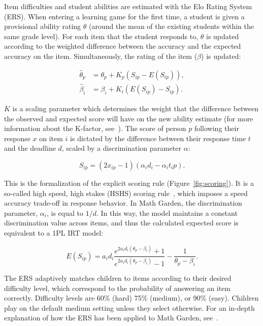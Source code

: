 \documentclass{edm_article}
\begin{document}
Item difficulties and student abilities are estimated with the Elo Rating System (ERS). %
When entering a learning game for the first time, a student is given a provisional ability rating $\theta$ (around the mean of the existing students within the same grade level). For each item that the student responds to, $\theta$ is updated according to the weighted difference between the accuracy and the expected accuracy on the item. Simultaneously, the rating of the item ($\beta$) is updated: 

\begin{align}
    \hat{\theta}_p &= \theta_p + K_p(S_{ip} - E(S_{ip})), \\
    \hat{\beta}_i &= \beta_i + K_i(E(S_{ip}) - S_{ip}).
\end{align}

\noindent $K$ is a scaling parameter which determines the weight that the difference between the observed and expected score will have on the new ability estimate (for more information about the K-factor, see~\cite{vermeiren2024balancing}). The score of person $p$ following their response $x$ on item $i$ is dictated by the difference between their response time $t$ and the deadline $d$, scaled by a discrimination parameter $\alpha$:

\begin{equation}
    S_{ip} = (2x_{ip} - 1)(\alpha_id_i - \alpha_it_ip).
    \label{eq:scoring}
\end{equation}

\noindent This is the formalization of the explicit scoring rule (Figure~\ref{fig:scoring}). It is a so-called high speed, high stakes (HSHS) scoring rule~\cite{maris2012speed}, which imposes a speed accuracy trade-off in response behavior. In Math Garden, the discrimination parameter, $\alpha_i$, is equal to $1/d$. In this way, the model maintains a constant discrimination value across items, and thus the calculated expected score is equivalent to a 1PL IRT model: 

\begin{equation}
    E(S_{ip}) = a_i d_i \frac{e^{2 a_i d_i (\theta_p - \beta_i)} + 1}{e^{2 a_i d_i (\theta_p - \beta_i)} - 1} - \frac{1}{\theta_p - \beta_i}.
\end{equation}

\noindent The ERS adaptively matches children to items according to their desired difficulty level, which correspond to the probability of answering an item correctly. Difficulty levels are 60\% (hard) 75\% (medium), or 90\% (easy). Children play on the default medium setting unless they select otherwise. For an in-depth explanation of how the ERS has been applied to Math Garden, see~\cite{klinkenberg2011computer}.
\end{document}
